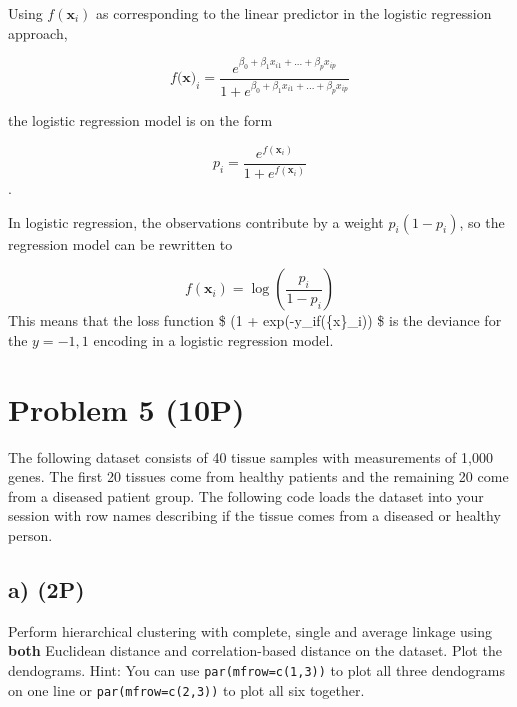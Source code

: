 \documentclass[]{article}
\newenvironment{Shaded}{\begin{snugshade}}{\end{snugshade}}
\newcommand{\CommentTok}[1]{\textcolor[rgb]{0.56,0.35,0.01}{\textit{#1}}}
\begin{document}
Using \(f({\boldsymbol x}_i)\) as corresponding to the linear predictor
in the logistic regression approach,

\[ f({\boldsymbol x)}_i = \frac{e^{\beta_0 + \beta_1x_{i1} + ... + \beta_p x_{ip}}}
{1 + e^{\beta_0 + \beta_1x_{i1} + ... + \beta_p x_{ip}}} \]

the logistic regression model is on the form

\[ p_i = \frac{e^{f({\boldsymbol x}_i)}}{1 + e^{f({\boldsymbol x}_i)}}\].

In logistic regression, the observations contribute by a weight
\(p_i(1-p_i)\), so the regression model can be rewritten to

\[ f({\boldsymbol x}_i) = \log(\frac{p_i}{1-p_i}) \] This means that the
loss function \$ \log(1 + exp(-y\_if(\{\boldsymbol x\}\_i)) \$ is the
deviance for the \(y=-1,1\) encoding in a logistic regression model.

\hypertarget{problem-5-10p}{%
\section{Problem 5 (10P)}\label{problem-5-10p}}

The following dataset consists of 40 tissue samples with measurements of
1,000 genes. The first 20 tissues come from healthy patients and the
remaining 20 come from a diseased patient group. The following code
loads the dataset into your session with row names describing if the
tissue comes from a diseased or healthy person.

\begin{Shaded}
\end{Shaded}

\hypertarget{a-2p}{%
\subsection{a) (2P)}\label{a-2p}}

Perform hierarchical clustering with complete, single and average
linkage using \textbf{both} Euclidean distance and correlation-based
distance on the dataset. Plot the dendograms. Hint: You can use
\texttt{par(mfrow=c(1,3))} to plot all three dendograms on one line or
\texttt{par(mfrow=c(2,3))} to plot all six together.
\end{document}
